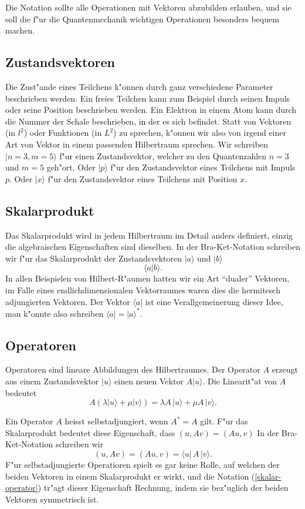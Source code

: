 Die Notation sollte alle Operationen mit Vektoren abzubilden erlauben,
und sie soll die f"ur die Quantenmechanik wichtigen Operationen besonders
bequem machen.

\subsection{Zustandsvektoren}
Die Zust"ande eines Teilchens k"onnen durch ganz verschiedene Parameter
beschrieben werden. Ein freies Teilchen kann zum Beispiel durch seinen
Impuls oder seine Position beschrieben werden. Ein Elektron in einem
Atom kann durch die Nummer der Schale beschrieben, in der es sich befindet. 
Statt von Vektoren (in $l^2$) oder Funktionen (in $L^2$) zu sprechen, k"onnen
wir also von irgend einer Art von Vektor in einem passenden Hilbertraum 
sprechen. Wir schreiben 
$|n=3,m=5\rangle$ f"ur einen Zustandsvektor, welcher zu den Quantenzahlen $n=3$ und $m=5$ geh"ort. Oder $|p\rangle$ f"ur den Zustandsvektor eines Teilchens
mit Impuls $p$. Oder $|x\rangle$ f"ur den Zustandsvektor eines Teilchens
mit Position $x$.

\subsection{Skalarprodukt}
Das Skalarprodukt wird in jedem Hilbertraum im Detail anders definiert,
einzig die algebraischen Eigenschaften sind dieselben. In der Bra-Ket-Notation
schreiben wir  f"ur das Skalarprodukt der Zustandsvektoren 
$|a\rangle$ und $|b\rangle$
\[
\langle a|b\rangle.
\]
In allen Beispielen von Hilbert-R"aumen hatten wir ein Art ``dualer''
Vektoren, im Falle eines endlichdimensionalen Vektorraumes waren dies
die hermitesch adjungierten Vektoren. Der Vektor $\langle a|$ ist eine
Verallgemeinerung dieser Idee, man k"onnte also schreiben
$\langle a|=|a\rangle^*$.

\subsection{Operatoren}
Operatoren sind lineare Abbildungen des Hilbertraumes. Der Operator $A$
erzeugt aus einem Zustandsvektor $|u\rangle$ einen neuen Vektor
$A|u\rangle$. Die Linearit"at von $A$ bedeutet
\[
A(\lambda |u\rangle + \mu |v\rangle)=\lambda A \,|u\rangle + \mu A\,|v\rangle.
\]

Ein Operator $A$ heisst selbstadjungiert, wenn $A^*=A$ gilt.
F"ur das Skalarprodukt bedeutet diese Eigenschaft, dass $(u, Av)=(Au,v)$ 
In der Bra-Ket-Notation schreiben wir 
\begin{equation}
(u,Av)=(Au,v)=\langle u|\,A\,|v\rangle.
\label{skalar-operator}
\end{equation}
F"ur selbstadjungierte Operatioren spielt es gar keine Rolle, auf welchen
der beiden Vektoren in einem Skalarprodukt er wirkt, und die Notation
(\ref{skalar-operator}) tr"agt dieser Eigenschaft Rechnung, indem sie
bez"uglich der beiden Vektoren symmetrisch ist.

